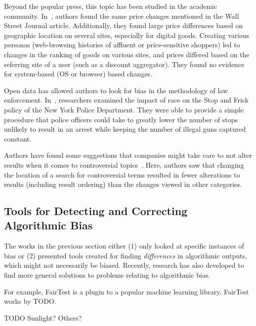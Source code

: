 \documentclass[12pt]{article}
\begin{document}


Beyond the popular press, this topic has been studied in the academic community.
In~\cite{Anonymous:2012wi}, authors found the same price changes mentioned in the Wall Street Journal article.
Additionally, they found large price differences based on geographic location on several sites, especially for digital goods.
Creating various personas (web-browsing histories of affluent or price-sensitive shoppers) led to changes in the ranking of goods on various sites, and prices differed based on the referring site of a user (such as a discount aggregator).
They found no evidence for system-based (OS or browser) based changes.

Open data has allowed authors to look for bias in the methodology of law enforcement.
In~\cite{goel2015precinct}, researchers examined the impact of race on the Stop and Frisk policy of the New York Police Department.
They were able to provide a simple procedure that police officers could take to greatly lower the number of stops unlikely to result in an arrest while keeping the number of illegal guns captured constant.

Authors have found some suggestions that companies might take care to not alter results when it comes to controversial topics~\cite{kliman2015location}.
Here, authors saw that changing the location of a search for controversial terms resulted in fewer alterations to results (including result ordering) than the changes viewed in other categories.


\subsection{Tools for Detecting and Correcting Algorithmic Bias}
The works in the previous section either (1) only looked at specific instances of bias or (2) presented tools created for finding \emph{differences} in algorithmic outputs, which might not necessarily be biased.
Recently, research has also developed to find more general solutions to problems relating to algorithmic bias.

For example, FairTest is a plugin to a popular machine learning library.
FairTest works by TODO.

TODO
Sunlight?
Others?
\end{document}
